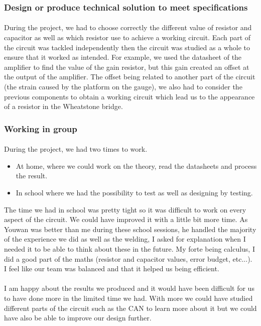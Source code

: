 \documentclass{article}[12pt]
\begin{document}
\begin{appendices}
\subsubsection{Design or produce technical 
solution to meet specifications}
\paragraph{}
During the project, we had to choose correctly the different value of resistor and capacitor as well as which resistor use to achieve a working circuit. Each part of the circuit was tackled independently then the circuit was studied as a whole to ensure that it worked as intended. For example, we used the datasheet of the amplifier to find the value of the gain resistor, but this gain created an offset at the output of the amplifier. The offset being related to another part of the circuit (the strain caused by the platform on the gauge), we also had to consider the previous components to obtain a working circuit which lead us to the appearance of a resistor in the Wheatstone bridge.
\subsubsection{Working in group}
\paragraph{}
During the project, we had two times to work.
\begin{itemize}
    \item At home, where we could work on the theory, read the datasheets and process the result. 
    \item In school where we had the possibility to test as well as designing by testing.
\end{itemize}
The time we had in school was pretty tight so it was difficult to work on every aspect of the circuit. We could have improved it with a little bit more time.
As Youwan was better than me during these school sessions, he handled the majority of the experience we did as well as the welding, I asked for explanation when I needed it to be able to think about these in the future.
My forte being calculus, I did a good part of the maths (resistor and capacitor values, error budget, etc...).
I feel like our team was balanced and that it helped us being efficient.
\paragraph{}
I am happy about the results we produced and it would have been difficult for us to have done more in the limited time we had.
With more we could have studied different parts of the circuit such as the CAN to learn more about it but we could have also be able to improve our design further.
\end{appendices}
\end{document}

